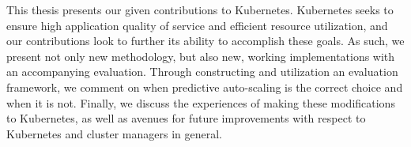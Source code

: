 This thesis presents our given contributions to Kubernetes. Kubernetes seeks to
ensure high application quality of service and efficient resource utilization,
and our contributions look to further its ability to accomplish these
goals. As such, we present not only new methodology, but also new, working
implementations with an accompanying evaluation. Through constructing and
utilization an evaluation framework, we comment on when predictive
auto-scaling is the correct choice and when it is not. Finally, we
discuss the experiences of making these modifications to Kubernetes, as well as
avenues for future improvements with respect to Kubernetes and cluster managers in
general.

